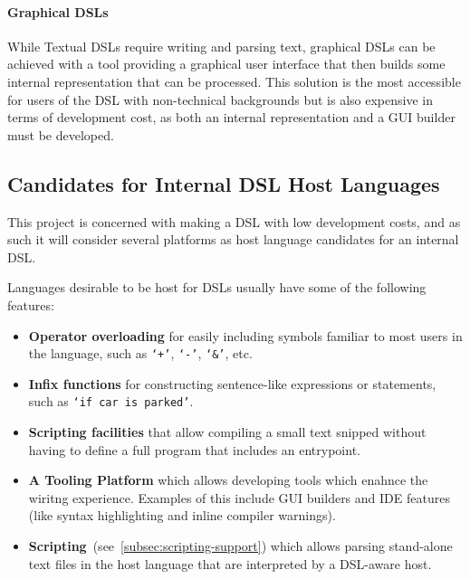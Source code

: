 \paragraph{Graphical DSLs}

While Textual DSLs require writing and parsing text, graphical DSLs can be achieved with a tool providing a graphical user interface that then builds some internal representation that can be processed.
This solution is the most accessible for users of the DSL with non-technical backgrounds but is also expensive in terms of development cost, as both an internal representation and a GUI builder must be developed.


\subsection{Candidates for Internal DSL Host Languages}\label{subsec:dsl-host-candidates}

This project is concerned with making a DSL with low development costs, and as such it will consider several platforms as host language candidates for an internal DSL\@.
\begin{definition}
    \label{def:host-lang-requirements}
    Languages desirable to be host for DSLs usually have some of the following features:
    \begin{itemize}
        \item \textbf{Operator overloading} for easily including symbols familiar to most users in the language, such as \texttt{`+'}, \texttt{`-'}, \texttt{`\&'}, etc.
        \item \textbf{Infix functions} for constructing sentence-like expressions or statements, such as \texttt{`if car is parked'}.
        \item \textbf{Scripting facilities} that allow compiling a small text snipped without having to define a full program that includes an entrypoint.
        \item \textbf{A Tooling Platform} which allows developing tools which enahnce the wiritng experience.
        Examples of this include GUI builders and IDE features (like syntax highlighting and inline compiler warnings).
        \item \textbf{Scripting}~(see~\autoref{subsec:scripting-support}) which allows parsing stand-alone text files in the host language that are interpreted by a DSL-aware host.
    \end{itemize}

\end{definition}

